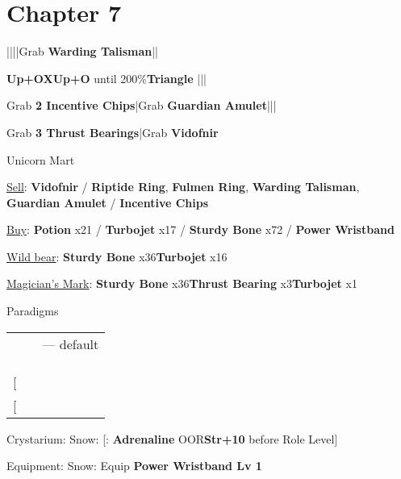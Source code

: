 \section{Chapter 7}
\begin{mainlist}
	\item {}|\skip|\skip|\skip|Grab \textbf{Warding Talisman}|\skip|
	\item {} \textbf{Up+O}\to \textbf{X}\to \textbf{Up+O} until 200\%\to \textbf{Triangle} |\skip||
	\item Grab \textbf{2 Incentive Chips}|Grab \textbf{Guardian Amulet}|\skip||\skip
	\item Grab \textbf{3 Thrust Bearings}|Grab \textbf{Vidofnir}
\end{mainlist}
\begin{shop}{Unicorn Mart}
	\item \underline{Sell}: \textbf{Vidofnir} / \textbf{Riptide Ring}, \textbf{Fulmen Ring}, \textbf{Warding Talisman}, \textbf{Guardian Amulet} / \textbf{Incentive Chips}
	\item \underline{Buy}: \textbf{\textbf{Potion}} x21 / \textbf{Turbojet} x17 / \textbf{Sturdy Bone} x72 / \textbf{Power Wristband}
\end{shop}
\begin{upgrade}
	\item \underline{Wild bear}: \textbf{Sturdy Bone} x36\to \textbf{Turbojet} x16
	\item \underline{Magician's Mark}: \textbf{Sturdy Bone} x36\to \textbf{Thrust Bearing} x3\to \textbf{Turbojet} x1
\end{upgrade}
\begin{menu}
	\item Paradigms
	\begin{tabular}{ccl}
		\com       & \rav & --- default \\
		\com       & \med &             \\
		\sen       & \med &             \\
		\sen       & \syn &             \\
		{[}\rav{]} & \rav &             \\
		{[}\rav{]} & \rav &
	\end{tabular}
	\item Crystarium: Snow: [\com: \textbf{Adrenaline} OOR\to \textbf{Str+10} before Role Level]
	\item Equipment: Snow: Equip \textbf{Power Wristband Lv 1}
\end{menu}
